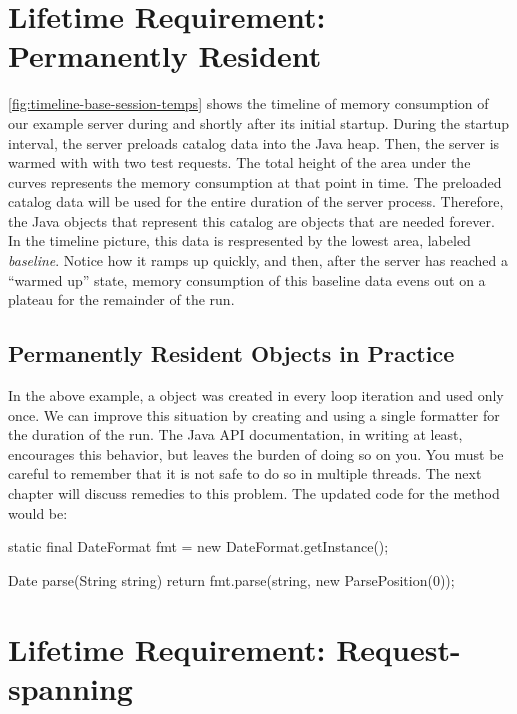 \section{Lifetime Requirement: Permanently Resident}
\label{sec:forever-lifetime}

\autoref{fig:timeline-base-session-temps} shows the timeline of memory
consumption of our example server 
during and shortly after its initial startup.
During the startup interval, the server preloads catalog data into
the Java heap. Then, the server is warmed with with two test requests.
The total height of the area
under the curves represents the memory consumption at that point in time. 
The preloaded catalog
data will be used for the entire duration of the server process.
Therefore, the Java objects that represent this catalog are objects that are
needed forever. In the timeline picture, this data is respresented by the lowest area, labeled
\emph{baseline}. Notice how it ramps up quickly, and then, after the server has
reached a ``warmed up'' state, memory consumption of this baseline data evens out
on a plateau for the remainder of the run.

\subsection{Permanently Resident Objects in Practice}

In the above example, a  object was created in every loop
iteration and used only once. We can improve this situation by creating and using
a single formatter for the duration of the run. The Java API documentation, in
writing at least, encourages this behavior, but leaves the burden of doing so on
you. You must be careful to remember that it is not safe to do so in multiple
threads. The next chapter will discuss remedies to this problem. The updated code
for the  method would be:

\begin{shortlisting}
static final DateFormat fmt = new DateFormat.getInstance();

Date parse(String string) {
	return fmt.parse(string, new ParsePosition(0));
}
\end{shortlisting} 


\section{Lifetime Requirement: Request-spanning}
\label{sec:correlated-with-need}

